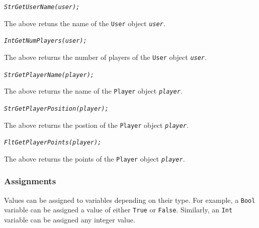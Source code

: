 \documentclass[12pt]{report}
\begin{document}
\begin{alltt}\begin{singlespace}
            \textit{Str GetUserName(user);}\end{singlespace}
\end{alltt}

The above retuns the name of the \texttt{User} object \textit{\texttt{user}}.

\begin{alltt}\begin{singlespace}
            \textit{Int GetNumPlayers(user);}\end{singlespace}
\end{alltt}
     
The above returns the number of players of the \texttt{User} object \textit{\texttt{user}}.

\begin{alltt}\begin{singlespace}
            \textit{Str GetPlayerName(player);}\end{singlespace}
\end{alltt}

The above returns the name of the \texttt{Player} object \textit{\texttt{player}}.

\begin{alltt}\begin{singlespace}
            \textit{Str GetPlayerPosition(player);}\end{singlespace}
\end{alltt}

The above returns the postion of the \texttt{Player} object \textit{\texttt{player}}.

\begin{alltt}\begin{singlespace}
            \textit{Flt GetPlayerPoints(player);}\end{singlespace}
\end{alltt}

The above returns the points of the \texttt{Player} object \textit{\texttt{player}}.

\subsubsection{Assignments}

Values can be assigned to variables depending on their type. For example,  a \texttt{Bool} variable can be assigned a value of either \texttt{True} or \texttt{False}. Similarly, an \texttt{Int} variable can be assigned any integer value. 
\end{document}

